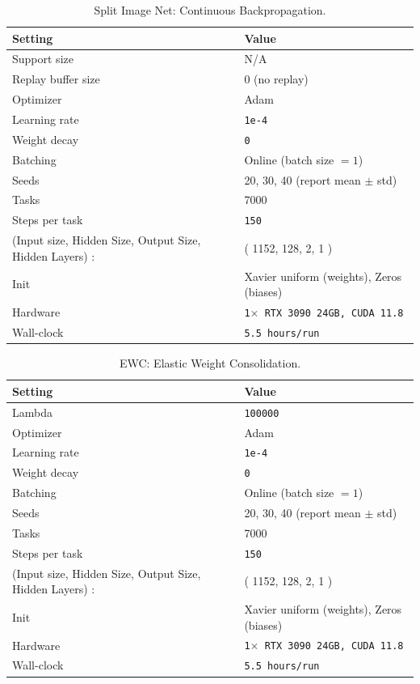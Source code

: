 \documentclass{article}
\begin{document}
\begin{table}[H]
\centering
\footnotesize
\caption{Split Image Net: Continuous Backpropagation.}
\label{tab:split_image_net_cbp}
\begin{tabular}{@{}ll@{}}
\toprule
Setting & Value \\ \midrule
Support size & N/A \\
Replay buffer size & 0 (no replay) \\
Optimizer & Adam  \\
Learning rate & \texttt{1e-4} \\
Weight decay & \texttt{0} \\
Batching & Online (batch size $=1$) \\
Seeds & 20, 30, 40 (report mean $\pm$ std) \\
Tasks & 7000 \\
Steps per task & \texttt{150} \\
(Input size, Hidden Size, Output Size, Hidden Layers) : & ( 1152, 128, 2, 1 ) \\ 
Init &  Xavier uniform (weights), Zeros (biases)\\
Hardware & \texttt{1$\times$ RTX 3090 24GB, CUDA 11.8} \\
Wall-clock & \texttt{5.5 hours/run} \\
\bottomrule
\end{tabular}
\end{table}




\begin{table}[H]
\centering
\footnotesize
\caption{EWC: Elastic Weight Consolidation.}
\label{tab:split_image_net_cbp}
\begin{tabular}{@{}ll@{}}
\toprule
Setting & Value \\ \midrule
Lambda &\texttt{100000} \\
Optimizer & Adam  \\
Learning rate & \texttt{1e-4} \\
Weight decay & \texttt{0} \\
Batching & Online (batch size $=1$) \\
Seeds & 20, 30, 40 (report mean $\pm$ std) \\
Tasks & 7000 \\
Steps per task & \texttt{150} \\
(Input size, Hidden Size, Output Size, Hidden Layers) : & ( 1152, 128, 2, 1 ) \\ 
Init &  Xavier uniform (weights), Zeros (biases)\\
Hardware & \texttt{1$\times$ RTX 3090 24GB, CUDA 11.8} \\
Wall-clock & \texttt{5.5 hours/run} \\
\bottomrule
\end{tabular}
\end{table}
\end{document}
